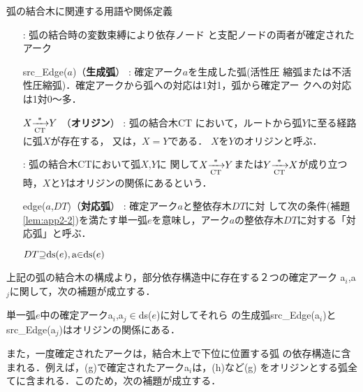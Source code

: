 \myhalfskip
\hspace{-5mm}
\fbox
{
\begin{minipage}{13.7cm}
\mygapskip

弧の結合木に関連する用語や関係定義

\begin{itemize}
\item[\myitemindent {\bf 確定アーク}] : 弧の結合時の変数束縛により依存ノード
と支配ノードの両者が確定されたアーク

\item[\myitemindent src\_Edge($a$)（{\bf 生成弧}）] : 確定アーク$a$を生成した弧(活性圧
縮弧または不活性圧縮弧)．確定アークから弧への対応は1対1，弧から確定アー
クへの対応は1対0〜多．

\item[\myitemindent $X {\xrightarrow[{\rm CT}]{*}} Y$ （{\bf オリジン}）]
: 弧の結合木CT において，ルートから弧$Y$に至る経路に弧$X$が存在する，
又は，$X=Y$である．
$X$を$Y$のオリジンと呼ぶ．

\item[\myitemindent {\bf オリジンの関係}] : 弧の結合木CTにおいて弧$X$,$Y$に
関して$X {\xrightarrow[{\rm CT}]{*}} Y$または$Y {\xrightarrow[{\rm
CT}]{*}} X$が成り立つ時，$X$と$Y$はオリジンの関係にあるという．

\item[\myitemindent edge($a$,$DT$)（{\bf 対応弧}）] : 確定アーク$a$と整依存木$DT$に対
して次の条件(補題\ref{lem:app2-2})を満たす単一弧$e$を意味し，アーク$a$の整依存木$DT$に対する「対応弧」と呼ぶ．

{\myitemindent}$DT {\supseteq} {\rm ds(}e{\rm )},{\rm a}{\in}{\rm ds(}e{\rm )}$


\end{itemize}
\myhalfskip
\end{minipage}
}

\myhalfskip

{\mynoindent}上記の弧の結合木の構成より，部分依存構造中に存在する２つの確定アーク
a$_i$,a$_j$に関して，次の補題が成立する．

\begin{lemma}[同一部分依存構造中のアークの関係]
\label{lem:TwoArcsInOneDS}
単一弧$e$中の確定アークa$_i$,a$_j{\in}${\rm ds(}$e${\rm )}に対してそれら
の生成弧src\_Edge(a$_i$)とsrc\_Edge(a$_j$)はオリジンの関係にある．
\end{lemma}

{\mynoindent}また，一度確定されたアークは，結合木上で下位に位置する弧
の依存構造に含まれる．例えば，(g)で確定されたアークa$_i$は，(h)など(g)
をオリジンとする弧全てに含まれる．このため，次の補題が成立する．

